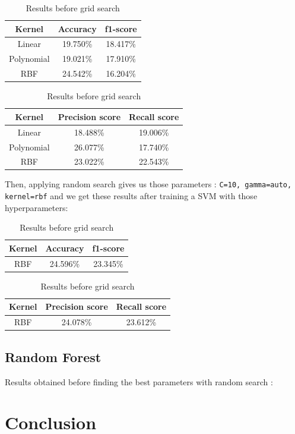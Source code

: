 \documentclass[twocolumn]{article}
\begin{document}
\begin{table}[h]
    \centering
    \begin{tabular}{|c|c|c|}
    \hline
      Kernel & Accuracy & f1-score\\
       \hline
      Linear & 19.750\% & 18.417\%\\
        \hline
      Polynomial & 19.021\% & 17.910\%\\
        \hline
      RBF & 24.542\% & 16.204\%\\
    \hline
    \end{tabular}
    \label{tab:my_label}

    \begin{tabular}{|c|c|c|}
    \hline
    Kernel & Precision score & Recall score\\
    \hline
    Linear & 18.488\% & 19.006\% \\
    \hline
    Polynomial & 26.077\% & 17.740\% \\
    \hline
    RBF & 23.022\% & 22.543\% \\
    \hline
    \end{tabular}
    \caption{Results before grid search}

\end{table}

Then, applying random search gives us those parameters : \texttt{C=10, gamma=auto, kernel=rbf} and we get these results after training a SVM with those hyperparameters:


\begin{table}[h]
    \centering
    \begin{tabular}{|c|c|c|}
    \hline
      Kernel & Accuracy & f1-score\\
      \hline
      RBF & 24.596\% & 23.345\%\\
    \hline
    \end{tabular}
    
    \begin{tabular}{|c|c|c|}
    \hline
    Kernel & Precision score & Recall score\\
    \hline
    RBF & 24.078\% & 23.612\% \\
    \hline
    \end{tabular}

    \label{tab:my_label}
    \caption{Results before grid search}
\end{table}

\subsection{Random Forest}
Results obtained before finding the best parameters with random search :


\section{Conclusion}
\end{document}
